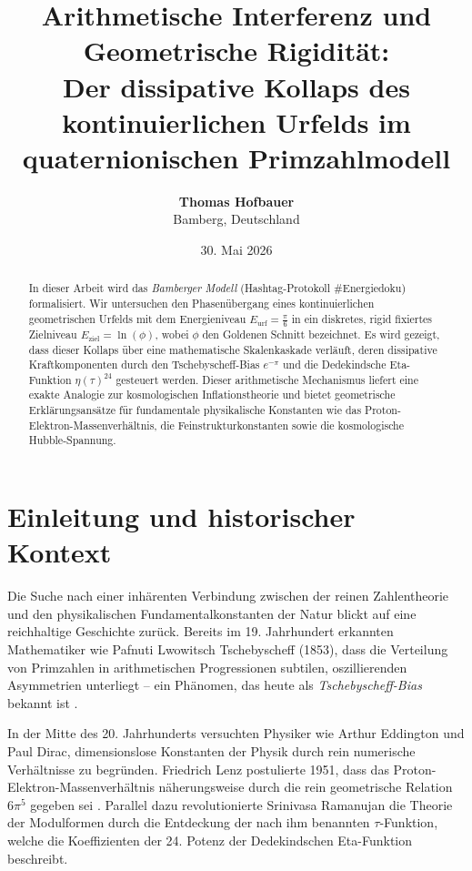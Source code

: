 \documentclass[11pt,a4paper]{article}
\title{\textbf{Arithmetische Interferenz und Geometrische Rigidität:\\
		Der dissipative Kollaps des kontinuierlichen Urfelds im quaternionischen Primzahlmodell}}
\author{\textbf{Thomas Hofbauer} \\
	Bamberg, Deutschland}
\date{30. Mai 2026}
\begin{document}
	
	\maketitle
	
	\begin{abstract}
		In dieser Arbeit wird das \emph{Bamberger Modell} (Hashtag-Protokoll \#Energiedoku) formalisiert. Wir untersuchen den Phasenübergang eines kontinuierlichen geometrischen Urfelds mit dem Energieniveau $E_{\text{urf}} = \frac{\pi}{6}$ in ein diskretes, rigid fixiertes Zielniveau $E_{\text{ziel}} = \ln(\phi)$, wobei $\phi$ den Goldenen Schnitt bezeichnet. Es wird gezeigt, dass dieser Kollaps über eine mathematische Skalenkaskade verläuft, deren dissipative Kraftkomponenten durch den Tschebyscheff-Bias $e^{-\pi}$ und die Dedekindsche Eta-Funktion $\eta(\tau)^{24}$ gesteuert werden. Dieser arithmetische Mechanismus liefert eine exakte Analogie zur kosmologischen Inflationstheorie und bietet geometrische Erklärungsansätze für fundamentale physikalische Konstanten wie das Proton-Elektron-Massenverhältnis, die Feinstrukturkonstanten sowie die kosmologische Hubble-Spannung.
	\end{abstract}
	
	\tableofcontents
	\newpage
	
	\section{Einleitung und historischer Kontext}
	Die Suche nach einer inhärenten Verbindung zwischen der reinen Zahlentheorie und den physikalischen Fundamentalkonstanten der Natur blickt auf eine reichhaltige Geschichte zurück. Bereits im 19. Jahrhundert erkannten Mathematiker wie Pafnuti Lwowitsch Tschebyscheff (1853), dass die Verteilung von Primzahlen in arithmetischen Progressionen subtilen, oszillierenden Asymmetrien unterliegt -- ein Phänomen, das heute als \emph{Tschebyscheff-Bias} bekannt ist \cite{chebyshev}. 
	
	In der Mitte des 20. Jahrhunderts versuchten Physiker wie Arthur Eddington und Paul Dirac, dimensionslose Konstanten der Physik durch rein numerische Verhältnisse zu begründen. Friedrich Lenz postulierte 1951, dass das Proton-Elektron-Massenverhältnis näherungsweise durch die rein geometrische Relation $6\pi^5$ gegeben sei \cite{lenz}. Parallel dazu revolutionierte Srinivasa Ramanujan die Theorie der Modulformen durch die Entdeckung der nach ihm benannten $\tau$-Funktion, welche die Koeffizienten der 24. Potenz der Dedekindschen Eta-Funktion beschreibt.
	
\end{document}
